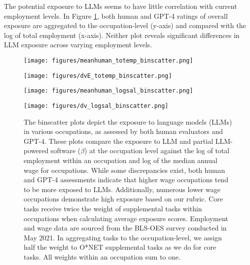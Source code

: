 \documentclass[11pt]{article}
\begin{document}


The potential exposure to LLMs seems to have little correlation with current employment levels. In Figure \ref{binscatters}, both human and GPT-4 ratings of overall exposure are aggregated to the occupation-level (y-axis) and compared with the log of total employment (x-axis). Neither plot reveals significant differences in LLM exposure across varying employment levels.



\begin{figure}[htbp]\small
\centering
\begin{minipage}[t]{0.48\textwidth}
\centering
\texttt{[image: figures/meanhuman\_totemp\_binscatter.png]}
\label{fig:meanhuman_totemp}
\end{minipage}
\hfill
\begin{minipage}[t]{0.48\textwidth}
\centering
\texttt{[image: figures/dvE\_totemp\_binscatter.png]}
\label{fig:dve_totemp}
\end{minipage}
\begin{minipage}[t]{0.48\textwidth}
\centering
\texttt{[image: figures/meanhuman\_logsal\_binscatter.png]}
\label{fig:human_binscatter}
\end{minipage}
\hfill
\begin{minipage}[t]{0.48\textwidth}
\centering
\texttt{[image: figures/dv\_logsal\_binscatter.png]}
\label{fig:dve_binscatter}
\end{minipage}
  \caption{The binscatter plots depict the exposure to language models (LLMs) in various occupations, as assessed by both human evaluators and GPT-4. These plots compare the exposure to LLM and partial LLM-powered software ($\beta$) at the occupation level against the log of total employment within an occupation and log of the median annual wage for occupations. While some discrepancies exist, both human and GPT-4 assessments indicate that higher wage occupations tend to be more exposed to LLMs. Additionally, numerous lower wage occupations demonstrate high exposure based on our rubric. Core tasks receive twice the weight of supplemental tasks within occupations when calculating average exposure scores. Employment and wage data are sourced from the BLS-OES survey conducted in May 2021. In aggregating tasks to the occupation-level, we assign half the weight to O*NET supplemental tasks as we do for core tasks. All weights within an occupation sum to one.}
  \label{binscatters}
\end{figure}
\end{document}
